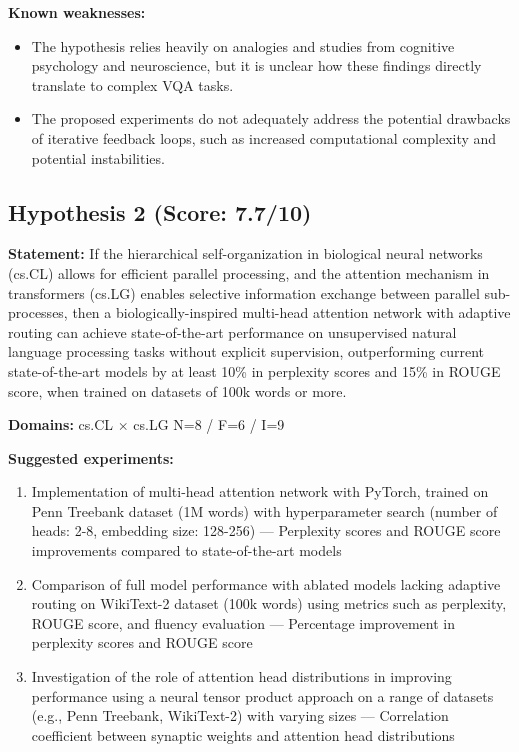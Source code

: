 \documentclass[12pt,a4paper]{article}
\begin{document}
\textbf{Known weaknesses:}
\begin{itemize}
  \item The hypothesis relies heavily on analogies and studies from cognitive psychology and neuroscience, but it is unclear how these findings directly translate to complex VQA tasks.
  \item The proposed experiments do not adequately address the potential drawbacks of iterative feedback loops, such as increased computational complexity and potential instabilities.
\end{itemize}
\subsection*{Hypothesis 2 (Score: 7.7/10)}

\textbf{Statement:} If the hierarchical self-organization in biological neural networks (cs.CL) allows for efficient parallel processing, and the attention mechanism in transformers (cs.LG) enables selective information exchange between parallel sub-processes, then a biologically-inspired multi-head attention network with adaptive routing can achieve state-of-the-art performance on unsupervised natural language processing tasks without explicit supervision, outperforming current state-of-the-art models by at least 10\% in perplexity scores and 15\% in ROUGE score, when trained on datasets of 100k words or more.

\noindent\textbf{Domains:} cs.CL $\times$ cs.LG
\hspace{1em} N=8 / F=6 / I=9

\textbf{Suggested experiments:}
\begin{enumerate}
  \item Implementation of multi-head attention network with PyTorch, trained on Penn Treebank dataset (1M words) with hyperparameter search (number of heads: 2-8, embedding size: 128-256) — Perplexity scores and ROUGE score improvements compared to state-of-the-art models
  \item Comparison of full model performance with ablated models lacking adaptive routing on WikiText-2 dataset (100k words) using metrics such as perplexity, ROUGE score, and fluency evaluation — Percentage improvement in perplexity scores and ROUGE score
  \item Investigation of the role of attention head distributions in improving performance using a neural tensor product approach on a range of datasets (e.g., Penn Treebank, WikiText-2) with varying sizes — Correlation coefficient between synaptic weights and attention head distributions
\end{enumerate}
\end{document}
